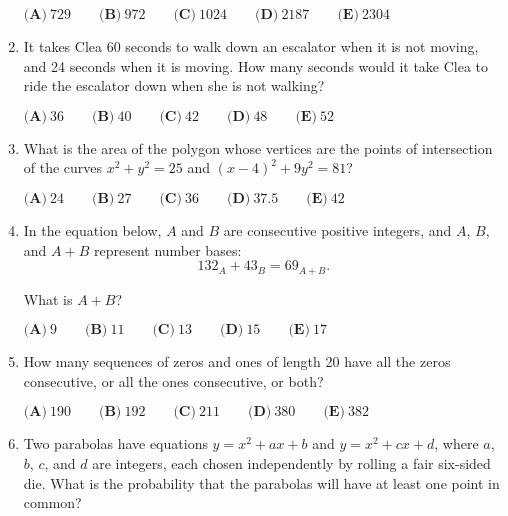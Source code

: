 \documentclass{article}
\begin{document}
\begin{enumerate}[label=\arabic*., itemsep=0.5em]
\(\textbf{(A)}\ 729\qquad\textbf{(B)}\ 972\qquad\textbf{(C)}\ 1024\qquad\textbf{(D)}\ 2187\qquad\textbf{(E)}\ 2304 \)\par \vspace{0.5em}\item It takes Clea 60 seconds to walk down an escalator when it is not moving, and 24 seconds when it is moving. How many seconds would it take Clea to ride the escalator down when she is not walking?

\(\textbf{(A)}\ 36\qquad\textbf{(B)}\ 40\qquad\textbf{(C)}\ 42\qquad\textbf{(D)}\ 48\qquad\textbf{(E)}\ 52 \)\par \vspace{0.5em}\item What is the area of the polygon whose vertices are the points of intersection of the curves \(x^2 + y^2 =25\) and \((x-4)^2 + 9y^2 = 81\)?

\(\textbf{(A)}\ 24\qquad\textbf{(B)}\ 27\qquad\textbf{(C)}\ 36\qquad\textbf{(D)}\ 37.5\qquad\textbf{(E)}\ 42\)\par \vspace{0.5em}\item In the equation below, \(A\) and \(B\) are consecutive positive integers, and \(A\), \(B\), and \(A+B\) represent number bases: 
\begin{equation*}
132_A+43_B=69_{A+B}.
\end{equation*}

What is \(A+B\)?

\(\textbf{(A)}\ 9\qquad\textbf{(B)}\ 11\qquad\textbf{(C)}\ 13\qquad\textbf{(D)}\ 15\qquad\textbf{(E)}\ 17 \)\par \vspace{0.5em}\item How many sequences of zeros and ones of length 20 have all the zeros consecutive, or all the ones consecutive, or both?

\(\textbf{(A)}\ 190\qquad\textbf{(B)}\ 192\qquad\textbf{(C)}\ 211\qquad\textbf{(D)}\ 380\qquad\textbf{(E)}\ 382 \)\par \vspace{0.5em}\item Two parabolas have equations \(y= x^2 + ax +b\) and \(y= x^2 + cx +d\), where \(a\), \(b\), \(c\), and \(d\) are integers, each chosen independently by rolling a fair six-sided die. What is the probability that the parabolas will have at least one point in common?


\end{enumerate}
\end{document}
